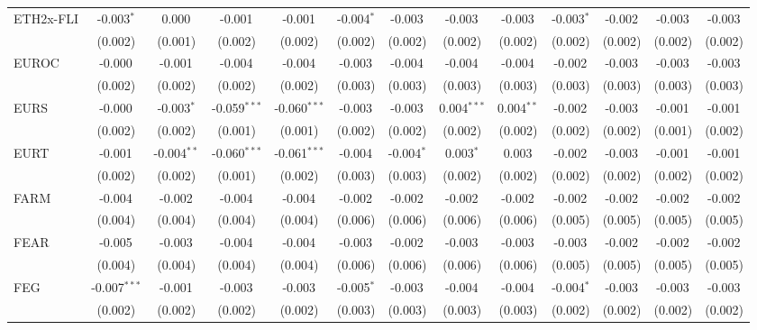 \begin{table}[!htbp]
\begin{tabular}{@{\extracolsep{5pt}}lcccccccccccc}
 ETH2x-FLI & -0.003$^{*}$ & 0.000$^{}$ & -0.001$^{}$ & -0.001$^{}$ & -0.004$^{*}$ & -0.003$^{}$ & -0.003$^{}$ & -0.003$^{}$ & -0.003$^{*}$ & -0.002$^{}$ & -0.003$^{}$ & -0.003$^{}$ \\
  & (0.002) & (0.001) & (0.002) & (0.002) & (0.002) & (0.002) & (0.002) & (0.002) & (0.002) & (0.002) & (0.002) & (0.002) \\
 EUROC & -0.000$^{}$ & -0.001$^{}$ & -0.004$^{}$ & -0.004$^{}$ & -0.003$^{}$ & -0.004$^{}$ & -0.004$^{}$ & -0.004$^{}$ & -0.002$^{}$ & -0.003$^{}$ & -0.003$^{}$ & -0.003$^{}$ \\
  & (0.002) & (0.002) & (0.002) & (0.002) & (0.003) & (0.003) & (0.003) & (0.003) & (0.003) & (0.003) & (0.003) & (0.003) \\
 EURS & -0.000$^{}$ & -0.003$^{*}$ & -0.059$^{***}$ & -0.060$^{***}$ & -0.003$^{}$ & -0.003$^{}$ & 0.004$^{***}$ & 0.004$^{**}$ & -0.002$^{}$ & -0.003$^{}$ & -0.001$^{}$ & -0.001$^{}$ \\
  & (0.002) & (0.002) & (0.001) & (0.001) & (0.002) & (0.002) & (0.002) & (0.002) & (0.002) & (0.002) & (0.001) & (0.002) \\
 EURT & -0.001$^{}$ & -0.004$^{**}$ & -0.060$^{***}$ & -0.061$^{***}$ & -0.004$^{}$ & -0.004$^{*}$ & 0.003$^{*}$ & 0.003$^{}$ & -0.002$^{}$ & -0.003$^{}$ & -0.001$^{}$ & -0.001$^{}$ \\
  & (0.002) & (0.002) & (0.001) & (0.002) & (0.003) & (0.003) & (0.002) & (0.002) & (0.002) & (0.002) & (0.002) & (0.002) \\
 FARM & -0.004$^{}$ & -0.002$^{}$ & -0.004$^{}$ & -0.004$^{}$ & -0.002$^{}$ & -0.002$^{}$ & -0.002$^{}$ & -0.002$^{}$ & -0.002$^{}$ & -0.002$^{}$ & -0.002$^{}$ & -0.002$^{}$ \\
  & (0.004) & (0.004) & (0.004) & (0.004) & (0.006) & (0.006) & (0.006) & (0.006) & (0.005) & (0.005) & (0.005) & (0.005) \\
 FEAR & -0.005$^{}$ & -0.003$^{}$ & -0.004$^{}$ & -0.004$^{}$ & -0.003$^{}$ & -0.002$^{}$ & -0.003$^{}$ & -0.003$^{}$ & -0.003$^{}$ & -0.002$^{}$ & -0.002$^{}$ & -0.002$^{}$ \\
  & (0.004) & (0.004) & (0.004) & (0.004) & (0.006) & (0.006) & (0.006) & (0.006) & (0.005) & (0.005) & (0.005) & (0.005) \\
 FEG & -0.007$^{***}$ & -0.001$^{}$ & -0.003$^{}$ & -0.003$^{}$ & -0.005$^{*}$ & -0.003$^{}$ & -0.004$^{}$ & -0.004$^{}$ & -0.004$^{*}$ & -0.003$^{}$ & -0.003$^{}$ & -0.003$^{}$ \\
  & (0.002) & (0.002) & (0.002) & (0.002) & (0.003) & (0.003) & (0.003) & (0.003) & (0.002) & (0.002) & (0.002) & (0.002) \\

\end{tabular}
\end{table}
